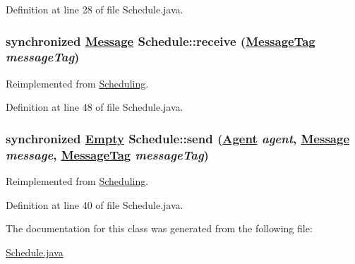 Definition at line 28 of file Schedule.java.\hypertarget{classSchedule_a1}{
\subsubsection[receive]{\setlength{\rightskip}{0pt plus 5cm}synchronized \hyperlink{interfaceMessage}{Message} Schedule::receive (\hyperlink{interfaceMessageTag}{Message\-Tag} {\em message\-Tag})}}
\label{classSchedule_a1}




Reimplemented from \hyperlink{interfaceScheduling_a1}{Scheduling}.

Definition at line 48 of file Schedule.java.\hypertarget{classSchedule_a0}{
\subsubsection[send]{\setlength{\rightskip}{0pt plus 5cm}synchronized \hyperlink{interfaceEmpty}{Empty} Schedule::send (\hyperlink{interfaceAgent}{Agent} {\em agent}, \hyperlink{interfaceMessage}{Message} {\em message}, \hyperlink{interfaceMessageTag}{Message\-Tag} {\em message\-Tag})}}
\label{classSchedule_a0}




Reimplemented from \hyperlink{interfaceScheduling_a0}{Scheduling}.

Definition at line 40 of file Schedule.java.

The documentation for this class was generated from the following file:\begin{CompactItemize}
\item 
\hyperlink{Schedule_8java-source}{Schedule.java}\end{CompactItemize}
